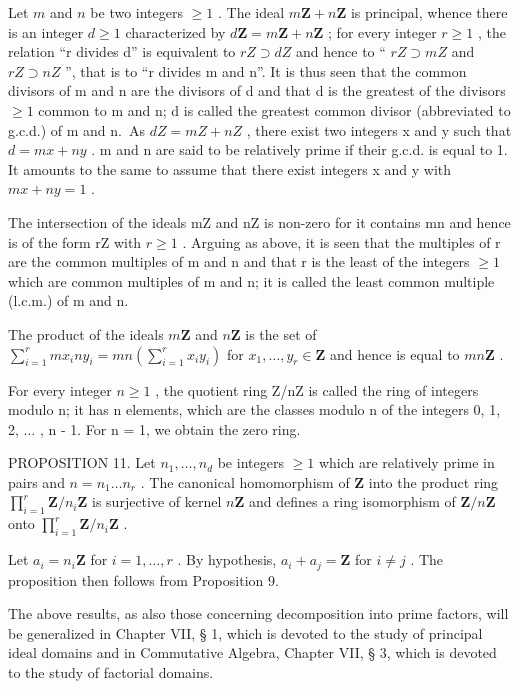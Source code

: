 Let \(m\) and \(n\) be two integers \(\geqslant 1\) . The ideal \(m\mathbf{Z} + n\mathbf{Z}\) is principal, whence there is an integer \(d \geqslant 1\) characterized by \(d\mathbf{Z} = m\mathbf{Z} + n\mathbf{Z}\) ; for every integer \(r \geqslant 1\) , the relation ``r divides d'' is equivalent to \(rZ \supset dZ\) and hence to `` \(rZ \supset mZ\) and \(rZ \supset nZ\) '', that is to ``r divides m and n''. It is thus seen that the common divisors of m and n are the divisors of d and that d is the greatest of the divisors \(\geqslant 1\) common to m and n; d is called the greatest common divisor (abbreviated to g.c.d.) of m and n.~As \(dZ = mZ + nZ\) , there exist two integers x and y such that \(d = mx + ny\) . m and n are said to be relatively prime if their g.c.d. is equal to 1. It amounts to the same to assume that there exist integers x and y with \(mx + ny = 1\) .

The intersection of the ideals mZ and nZ is non-zero for it contains mn and hence is of the form rZ with \(r \geqslant 1\) . Arguing as above, it is seen that the multiples of r are the common multiples of m and n and that r is the least of the integers \(\geqslant 1\) which are common multiples of m and n; it is called the least common multiple (l.c.m.) of m and n.

The product of the ideals \(m\mathbf{Z}\) and \(n\mathbf{Z}\) is the set of \(\sum_{i=1}^{r} mx_i ny_i = mn\left(\sum_{i=1}^{r} x_i y_i\right)\) for \(x_1, \ldots, y_r \in \mathbf{Z}\) and hence is equal to \(mn\mathbf{Z}\) .

For every integer \(n \geqslant 1\) , the quotient ring Z/nZ is called the ring of integers modulo n; it has n elements, which are the classes modulo n of the integers 0, 1, 2, \(\ldots\) , n - 1. For n = 1, we obtain the zero ring.

PROPOSITION 11. Let \(n_1, \ldots, n_d\) be integers \(\geqslant 1\) which are relatively prime in pairs and \(n = n_1 \ldots n_r\) . The canonical homomorphism of \(\mathbf{Z}\) into the product ring \(\prod_{i=1}^{r} \mathbf{Z} / n_i \mathbf{Z}\) is surjective of kernel \(n\mathbf{Z}\) and defines a ring isomorphism of \(\mathbf{Z} / n\mathbf{Z}\) onto \(\prod_{i=1}^{r} \mathbf{Z} / n_i \mathbf{Z}\) .

Let \(a_{i} = n_{i}\mathbf{Z}\) for \(i = 1, \ldots, r\) . By hypothesis, \(a_{i} + a_{j} = \mathbf{Z}\) for \(i \neq j\) . The proposition then follows from Proposition 9.

The above results, as also those concerning decomposition into prime factors, will be generalized in Chapter VII, § 1, which is devoted to the study of principal ideal domains and in Commutative Algebra, Chapter VII, § 3, which is devoted to the study of factorial domains.
\relax{}
